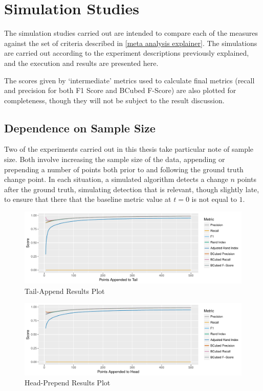 \documentclass{uvamscse}	%
\begin{document}
\section{Simulation Studies}

The simulation studies carried out are intended to compare each of the measures against the set of criteria described in \autoref{meta analysis explainer}. The simulations are carried out according to the experiment descriptions previously explained, and the execution and results are presented here.

The scores given by `intermediate' metrics used to calculate final metrics (recall and precision for both F1 Score and BCubed F-Score) are also plotted for completeness, though they will not be subject to the result discussion.

\subsection{Dependence on Sample Size}
\label{sample size dependence}

Two of the experiments carried out in this thesis take particular note of sample size. Both involve increasing the sample size of the data, appending or prepending a number of points both prior to and following the ground truth change point. In each situation, a simulated algorithm detects a change $n$ points after the ground truth, simulating detection that is relevant, though slightly late, to ensure that there that the baseline metric value at $t = 0$ is not equal to $1$.

\begin{figure}[h]
    \includegraphics[width=\textwidth]{figures/Experiment1}
    \caption{Tail-Append Results Plot}
    \label{fig:Experiment1}
\end{figure}

\begin{figure}[h]
    \includegraphics[width=\textwidth]{figures/Experiment4}
    \caption{Head-Prepend Results Plot}
    \label{fig:Experiment2}
\end{figure}
\end{document}
